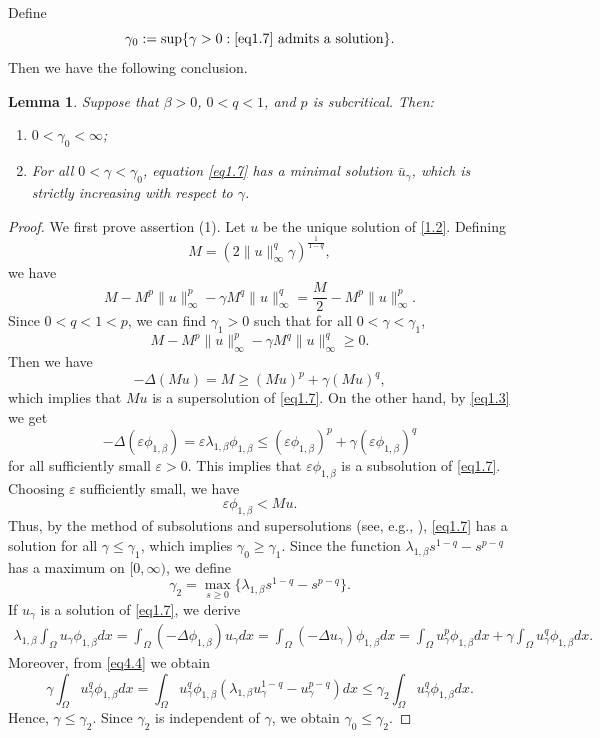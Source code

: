 \documentclass[12pt,reqno]{amsart}
\numberwithin{equation}{section}
\newtheorem{lemma}[theorem]{Lemma}
\theoremstyle{definition}
\begin{document}
Define 
$$
\gamma_0:=\sup\{\gamma>0: \eqref{eq1.7}\ \text{admits a solution} \}.
$$
Then we have the following conclusion.
\begin{lemma}\label{lemma4.2}
Suppose that $\beta>0$, $0<q<1$, and $p$ is subcritical. Then:
\begin{enumerate}
\item $0<\gamma_0<\infty$;
\item For all $0<\gamma<\gamma_0$, equation \eqref{eq1.7} has a minimal solution $\bar{u}_\gamma$, which is strictly increasing with respect to $\gamma$.
\end{enumerate}
\end{lemma}

\begin{proof}
We first prove assertion (1). Let $u$ be the unique solution of \eqref{1.2}. Defining
\begin{equation}\label{m2}
M=(2\|u\|_\infty^q\gamma)^{\frac{1}{1-q}},
\end{equation}
we have 
$$
M-M^p\|u\|_\infty^p-\gamma M^q\|u\|_\infty^q=\frac{M}{2}-M^p\|u\|_\infty^p.
$$
Since $0<q<1<p$, we can find $\gamma_1>0$ such that for all $0<\gamma<\gamma_1$,
$$
M-M^p\|u\|_\infty^p-\gamma M^q\|u\|_\infty^q\ge0.
$$
Then we have 
$$
-\Delta (Mu)=M\ge (Mu)^p+\gamma (Mu)^q,
$$
which implies that $Mu$ is a supersolution of \eqref{eq1.7}. On the other hand, by \eqref{eq1.3} we get 
$$
-\Delta (\varepsilon\phi_{1,\beta})=\varepsilon\lambda_{1,\beta} \phi_{1,\beta}\le (\varepsilon \phi_{1,\beta})^p+\gamma(\varepsilon \phi_{1,\beta})^q
$$
for all sufficiently small $\varepsilon>0$. This implies that $\varepsilon\phi_{1,\beta}$ is a subsolution of \eqref{eq1.7}. Choosing $\varepsilon$ sufficiently small, we have 
$$
\varepsilon\phi_{1,\beta}<Mu.
$$ 
Thus, by the method of subsolutions and supersolutions (see, e.g., \cite{I,P}), \eqref{eq1.7} has a solution for all $\gamma\le \gamma_1$, which implies $\gamma_0\ge \gamma_1$. Since the function $\lambda_{1,\beta}s^{1-q}-s^{p-q}$ has a maximum on $[0, \infty)$, we define 
\begin{equation}\label{eq4.4}
\gamma_2=\max_{s\ge 0}\{ \lambda_{1,\beta}s^{1-q}-s^{p-q}\}.
\end{equation}
If $u_\gamma$ is a solution of \eqref{eq1.7}, we derive 
\begin{align*}
\lambda_{1,\beta}\int_{\Omega}u_\gamma\phi_{1,\beta}dx=\int_{\Omega}(-\Delta \phi_{1,\beta})u_\gamma dx=\int_{\Omega}(-\Delta u_\gamma)\phi_{1,\beta}dx=\int_{\Omega}u_\gamma^p\phi_{1,\beta}dx+\gamma\int_{\Omega}u_\gamma^q\phi_{1,\beta}dx.
\end{align*}
Moreover, from \eqref{eq4.4} we obtain 
$$
\gamma\int_{\Omega}u_\gamma^q\phi_{1,\beta}dx=\int_{\Omega}u_\gamma^q\phi_{1,\beta}(\lambda_{1,\beta}u_\gamma^{1-q}-u_\gamma^{p-q})dx\le\gamma_2\int_{\Omega}u_\gamma^q\phi_{1,\beta}dx.
$$
Hence, $\gamma\le \gamma_2$. Since $\gamma_2$ is independent of $\gamma$, we obtain $\gamma_0\le\gamma_2$.


\end{proof}
\end{document}
